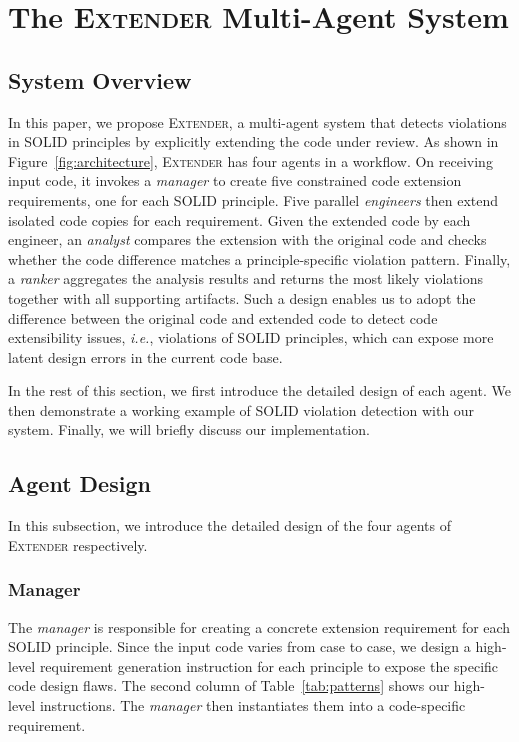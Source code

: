 \documentclass[sigconf,screen]{acmart}
\newcommand{\tool}{\textsc{Extender}\xspace}
\newcommand{\ie}{{\em i.e.},\xspace}
\begin{document}
\section{The \tool Multi-Agent System}\label{sec:method}

\subsection{System Overview}
In this paper, we propose \tool, a multi-agent system that detects violations in SOLID principles by explicitly extending the code under review.
As shown in Figure~\ref{fig:architecture}, \tool has four agents in a workflow.
On receiving input code, it invokes a \textit{manager} to create five constrained code extension requirements, one for each SOLID principle.
Five parallel \textit{engineers} then extend isolated code copies for each requirement.
Given the extended code by each engineer, an \textit{analyst} compares the extension with the original code and checks whether the code difference matches a principle-specific violation pattern.
Finally, a \textit{ranker} aggregates the analysis results and returns the most likely violations together with all supporting artifacts.
Such a design enables us to adopt the difference between the original code and extended code to detect code extensibility issues, \ie violations of SOLID principles, which can expose more latent design errors in the current code base.

In the rest of this section, we first introduce the detailed design of each agent.
We then demonstrate a working example of SOLID violation detection with our system.
Finally, we will briefly discuss our implementation. 


\subsection{Agent Design}
In this subsection, we introduce the detailed design of the four agents of \tool respectively.

\subsubsection{Manager}
The \textit{manager} is responsible for creating a concrete extension requirement for each SOLID principle.
Since the input code varies from case to case, we design a high-level requirement generation instruction for each principle to expose the specific code design flaws.
The second column of Table~\ref{tab:patterns} shows our high-level instructions. 
The \textit{manager} then instantiates them into a code-specific requirement.
\end{document}
